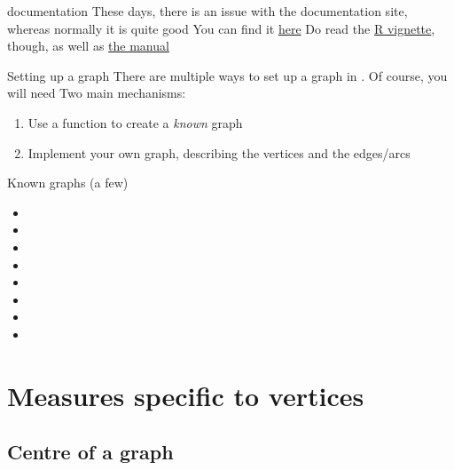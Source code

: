 \documentclass[aspectratio=43]{beamer}
\begin{document}
\begin{frame}{ documentation}
	These days, there is an issue with the  documentation site, whereas normally it is quite good
	\vfill
	You can find it \href{https://igraph.org/r/doc/}{here}
	\vfill
	Do read the \href{https://cran.r-project.org/web/packages/igraph/vignettes/igraph.html}{R vignette}, though, as well as \href{https://cran.r-project.org/web/packages/igraph/igraph.pdf}{the manual}
\end{frame}

\begin{frame}{Setting up a graph}
	There are multiple ways to set up a graph in . Of course, you will need 
	\vfill
	Two main mechanisms:
	\begin{enumerate}
		\item Use a function to create a \emph{known} graph 
		\item Implement your own graph, describing the vertices and the edges/arcs
	\end{enumerate}
\end{frame}

\begin{frame}{Known graphs (a few)}
	\begin{itemize}
		\item {}
		\item {}
		\item {}
		\item {}
		\item {}
		\item {}
		\item {}
		\item {}
	\end{itemize}
\end{frame}


\section{Measures specific to vertices}

\subsection{Centre of a graph}
\end{document}
